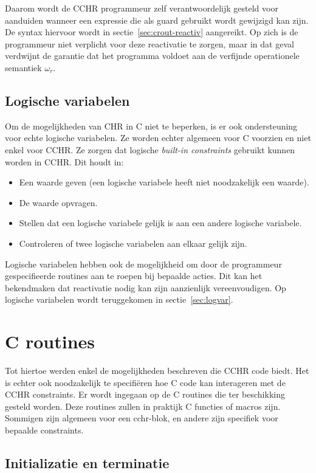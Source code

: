 Daarom wordt de CCHR programmeur zelf verantwoordelijk gesteld voor aanduiden wanneer een expressie die als guard gebruikt wordt gewijzigd kan zijn. De syntax hiervoor wordt in sectie~\ref{sec:crout-reactiv} aangereikt. Op zich is de programmeur niet verplicht voor deze reactivatie te zorgen, maar in dat geval verdwijnt de garantie dat het programma voldoet aan de verfijnde operationele semantiek $\omega_r$.

\subsection{Logische variabelen}

Om de mogelijkheden van CHR in C niet te beperken, is er ook ondersteuning voor echte logische variabelen. Ze worden echter algemeen voor C voorzien en niet enkel voor CCHR. Ze zorgen dat logische {\em built-in constraints} gebruikt kunnen worden in CCHR. Dit houdt in: \begin{itemize}
  \item Een waarde geven (een logische variabele heeft niet noodzakelijk een waarde).
  \item De waarde opvragen.
  \item Stellen dat een logische variabele gelijk is aan een andere logische variabele.
  \item Controleren of twee logische variabelen aan elkaar gelijk zijn.
\end{itemize}

Logische variabelen hebben ook de mogelijkheid om door de programmeur gespecifieerde routines aan te roepen bij bepaalde acties. Dit kan het bekendmaken dat reactivatie nodig kan zijn aanzienlijk vereenvoudigen. Op logische variabelen wordt teruggekomen in sectie~\ref{sec:logvar}.

\section{C routines}

Tot hiertoe werden enkel de mogelijkheden beschreven die CCHR code biedt. Het is echter ook noodzakelijk te specifi\"eren hoe C code kan interageren met de CCHR constraints. Er wordt ingegaan op de C routines die ter beschikking gesteld worden. Deze routines zullen in praktijk C functies of macros zijn. Sommigen zijn algemeen voor een cchr-blok, en andere zijn specifiek voor bepaalde constraints.

\subsection{Initializatie en terminatie}

